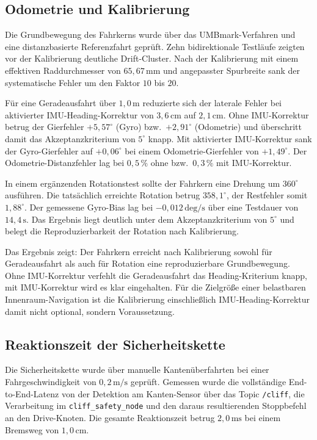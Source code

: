 \subsection{Odometrie und Kalibrierung}

Die Grundbewegung des Fahrkerns wurde über das UMBmark-Verfahren und eine distanzbasierte Referenzfahrt geprüft. Zehn bidirektionale Testläufe zeigten vor der Kalibrierung deutliche Drift-Cluster. Nach der Kalibrierung mit einem effektiven Raddurchmesser von $65{,}67\,\mathrm{mm}$ und angepasster Spurbreite sank der systematische Fehler um den Faktor $10$ bis $20$.

Für eine Geradeausfahrt über $1{,}0\,\mathrm{m}$ reduzierte sich der laterale Fehler bei aktivierter IMU-Heading-Korrektur von $3{,}6\,\mathrm{cm}$ auf $2{,}1\,\mathrm{cm}$. Ohne IMU-Korrektur betrug der Gierfehler $+5{,}57^\circ$ (Gyro) bzw.\ $+2{,}91^\circ$ (Odometrie) und überschritt damit das Akzeptanzkriterium von $5^\circ$ knapp. Mit aktivierter IMU-Korrektur sank der Gyro-Gierfehler auf $+0{,}06^\circ$ bei einem Odometrie-Gierfehler von $+1{,}49^\circ$. Der Odometrie-Distanzfehler lag bei $0{,}5\,\%$ ohne bzw.\ $0{,}3\,\%$ mit IMU-Korrektur.

In einem ergänzenden Rotationstest sollte der Fahrkern eine Drehung um $360^\circ$ ausführen. Die tatsächlich erreichte Rotation betrug $358{,}1^\circ$, der Restfehler somit $1{,}88^\circ$. Der gemessene Gyro-Bias lag bei $-0{,}012\,\mathrm{deg/s}$ über eine Testdauer von $14{,}4\,\mathrm{s}$. Das Ergebnis liegt deutlich unter dem Akzeptanzkriterium von $5^\circ$ und belegt die Reproduzierbarkeit der Rotation nach Kalibrierung.

Das Ergebnis zeigt: Der Fahrkern erreicht nach Kalibrierung sowohl für Geradeausfahrt als auch für Rotation eine reproduzierbare Grundbewegung. Ohne IMU-Korrektur verfehlt die Geradeausfahrt das Heading-Kriterium knapp, mit IMU-Korrektur wird es klar eingehalten. Für die Zielgröße einer belastbaren Innenraum-Navigation ist die Kalibrierung einschließlich IMU-Heading-Korrektur damit nicht optional, sondern Voraussetzung.

\subsection{Reaktionszeit der Sicherheitskette}

Die Sicherheitskette wurde über manuelle Kantenüberfahrten bei einer Fahrgeschwindigkeit von $0{,}2\,\mathrm{m/s}$ geprüft. Gemessen wurde die vollständige End-to-End-Latenz von der Detektion am Kanten-Sensor über das Topic \texttt{/cliff}, die Verarbeitung im \texttt{cliff\_safety\_node} und den daraus resultierenden Stoppbefehl an den Drive-Knoten. Die gesamte Reaktionszeit betrug $2{,}0\,\mathrm{ms}$ bei einem Bremsweg von $1{,}0\,\mathrm{cm}$.

